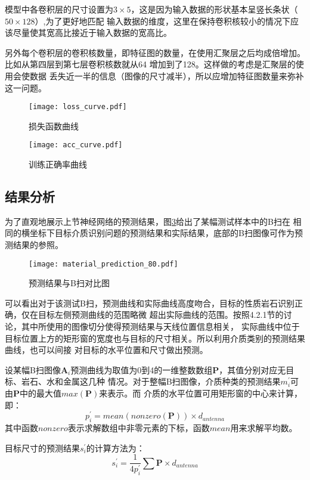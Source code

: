 模型中各卷积层的尺寸设置为$3\times 5$，这是因为输入数据的形状基本呈竖长条状（$50\times 128$）,为了更好地匹配
输入数据的维度，这里在保持卷积核较小的情况下应该尽量使其宽高比接近于输入数据的宽高比。

另外每个卷积层的卷积核数量，即特征图的数量，在使用汇聚层之后均成倍增加。比如从第四层到第七层卷积核数就从64
增加到了128。这样做的考虑是汇聚层的使用会使数据
丢失近一半的信息（图像的尺寸减半），所以应增加特征图数量来弥补这一问题。
\begin{figure}[htbp]
	\texttt{[image: loss\_curve.pdf]}
	\caption[]{损失函数曲线}
	\label{loss_curve}
\end{figure}
\begin{figure}[htbp]
	\texttt{[image: acc\_curve.pdf]}
	\caption[]{训练正确率曲线}
	\label{acc_curve}
\end{figure}
\subsection{结果分析}
为了直观地展示上节神经网络的预测结果，图\ref{material_prediction}给出了某幅测试样本中的B扫在
相同的横坐标下目标介质识别问题的预测结果和实际结果，底部的B扫图像可作为预测结果的参照。
\begin{figure}[htbp]
	\texttt{[image: material\_prediction\_80.pdf]}
	\caption[]{预测结果与B扫对比图}
	\label{material_prediction}
\end{figure}

可以看出对于该测试B扫，预测曲线和实际曲线高度吻合，目标的性质岩石识别正确，仅在目标左侧预测曲线的范围略微
超出实际曲线的范围。按照4.2.1节的讨论，其中所使用的图像切分使得预测结果与天线位置信息相关，
实际曲线中位于目标位置上方的矩形窗的宽度也与目标的尺寸相关。所以利用介质类别的预测结果曲线，也可以间接
对目标的水平位置和尺寸做出预测。

设某幅B扫图像$\mathbf{A}_i$预测曲线为取值为0到4的一维整数数组$\mathbf{P}$，其值分别对应无目标、岩石、水和金属这几种
情况。对于整幅B扫图像，介质种类的预测结果$m_i^{\prime}$可由$\mathbf{P}$中的最大值$max(\mathbf{P})$来表示。而
介质的水平位置可用矩形窗的中心来计算，即：
\begin{equation}
	p_i^{\prime} = mean(nonzero(\mathbf{P}))\times d_{antenna}
\end{equation}
其中函数$nonzero$表示求解数组中非零元素的下标，函数$mean$用来求解平均数。

目标尺寸的预测结果$s_i^{\prime}$的计算方法为：
\begin{equation}
	s_i^{\prime} = \frac{1}{4 p_i^{\prime}}\sum{\mathbf{P}}\times d_{antenna}
\end{equation}

